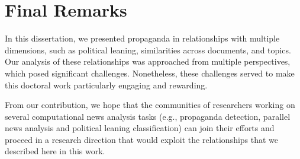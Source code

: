 \section{\statusgreen Final Remarks}
\label{sec:discussion_conclusions}

In this dissertation, we presented propaganda in relationships with multiple dimensions, such as political leaning, similarities across documents, and topics. Our analysis of these relationships was approached from multiple perspectives, which posed significant challenges. Nonetheless, these challenges served to make this doctoral work particularly engaging and rewarding.

From our contribution, we hope that the communities of researchers working on several computational news analysis tasks (e.g., propaganda detection, parallel news analysis and political leaning classification) can join their efforts and proceed in a research direction that would exploit the relationships that we described here in this work.
